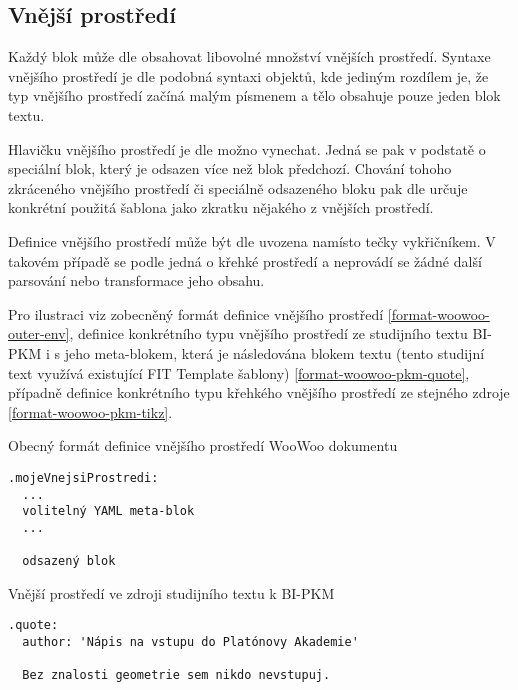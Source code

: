\subsection{Vnější prostředí}

Každý blok může dle \cite{woowoo} obsahovat libovolné množství vnějších prostředí. Syntaxe vnějšího prostředí je dle
\cite{woowoo} podobná syntaxi objektů, kde jediným rozdílem je, že typ vnějšího prostředí začíná malým písmenem a tělo
obsahuje pouze jeden blok textu.

Hlavičku vnějšího prostředí je dle \cite{woowoo} možno vynechat. Jedná se pak v podstatě o speciální blok, který je
odsazen více než blok předchozí. Chování tohoho zkráceného vnějšího prostředí či speciálně odsazeného bloku pak dle
\cite{woowoo} určuje konkrétní použitá šablona jako zkratku nějakého z vnějších prostředí.

Definice vnějšího prostředí může být dle \cite{woowoo} uvozena namísto tečky vykřičníkem. V takovém případě se podle
\cite{woowoo} jedná o křehké prostředí a neprovádí se žádné další parsování nebo transformace jeho obsahu.

Pro ilustraci viz zobecněný formát definice vnějšího prostředí \ref{format-woowoo-outer-env}, definice konkrétního typu
vnějšího prostředí ze studijního textu BI-PKM i s jeho meta-blokem, která je následována blokem textu (tento
studijní text využívá existující FIT Template šablony) \ref{format-woowoo-pkm-quote}, případně definice konkrétního typu
křehkého vnějšího prostředí ze stejného zdroje \ref{format-woowoo-pkm-tikz}.

\begin{listing}
    \caption{Obecný formát definice vnějšího prostředí WooWoo dokumentu}
    \label{format-woowoo-outer-env}
    \begin{verbatim}
.mojeVnejsiProstredi:
  ...
  volitelný YAML meta-blok
  ...

  odsazený blok
    \end{verbatim}
\end{listing}

\begin{listing}
    \caption{Vnější prostředí ve zdroji studijního textu k BI-PKM \cite{pkm}}
    \label{format-woowoo-pkm-quote}
    \begin{verbatim}
.quote:
  author: 'Nápis na vstupu do Platónovy Akademie'

  Bez znalosti geometrie sem nikdo nevstupuj.
    \end{verbatim}
\end{listing}

